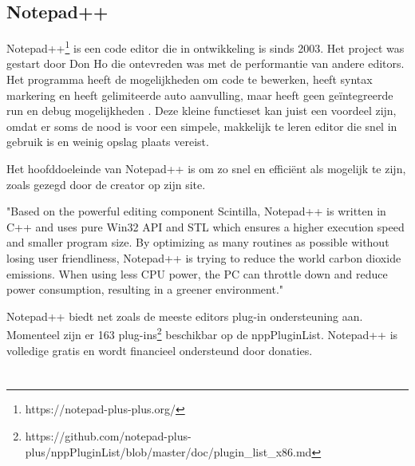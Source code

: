 \subsection{Notepad++}

Notepad++\footnote{https://notepad-plus-plus.org/} is een code editor die in ontwikkeling is sinds 2003. Het project was gestart door Don Ho die ontevreden was met de performantie van andere editors. Het programma heeft de mogelijkheden om code te bewerken, heeft syntax markering en heeft gelimiteerde auto aanvulling, maar heeft geen geïntegreerde run en debug mogelijkheden \autocite{Contributors2017}. Deze kleine functieset kan juist een voordeel zijn, omdat er soms de nood is voor een simpele, makkelijk te leren editor die snel in gebruik is en weinig opslag plaats vereist.

Het hoofddoeleinde van Notepad++ is om zo snel en efficiënt als mogelijk te zijn, zoals gezegd door de creator op zijn site. 
\begin{displayquote}
    "Based on the powerful editing component Scintilla, Notepad++ is written in C++ and uses pure Win32 API and STL which ensures a higher execution speed and smaller program size. By optimizing as many routines as possible without losing user friendliness, Notepad++ is trying to reduce the world carbon dioxide emissions. When using less CPU power, the PC can throttle down and reduce power consumption, resulting in a greener environment." \autocite{Ho2022}
\end{displayquote}


Notepad++ biedt net zoals de meeste editors plug-in ondersteuning aan. Momenteel zijn er 163 plug-ins\footnote{https://github.com/notepad-plus-plus/nppPluginList/blob/master/doc/plugin\_list\_x86.md} beschikbar op de nppPluginList. Notepad++ is volledige gratis en wordt financieel ondersteund door donaties.

\section{}

\newcommand{\requirementsNotepadFN}{\footnote{https://www.getpcapps.com/software/development/notepad-plus-plus-code-editor-installer-setup-windows.html}}
\newcommand{\requirementsVSCodeFN}{\footnote{https://code.visualstudio.com/docs/supporting/requirements}}
\newcommand{\requirementsEclipseFN}{\footnote{https://www.tabnine.com/blog/intellij-idea-vs-eclipse/}}
\newcommand{\requirementsIntelliJFN}{\footnote{https://www.jetbrains.com/help/idea/installation-guide.html}}
\newcommand{\requirementsVisualStudioFN}{\footnote{https://docs.microsoft.com/en-us/visualstudio/releases/2022/system-requirements}}

